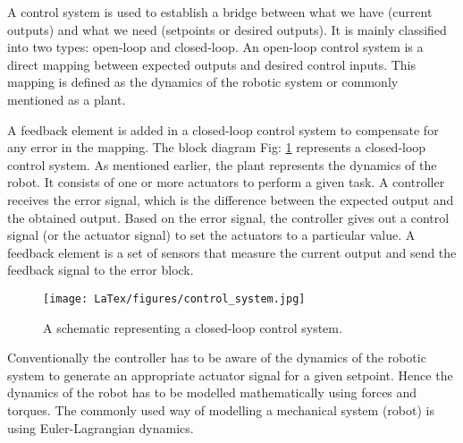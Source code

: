 
A control system is used to establish a bridge between what we have (current outputs) and what we need (setpoints or desired outputs). It is mainly classified into two types: open-loop and closed-loop. An open-loop control system is a direct mapping between expected outputs and desired control inputs. This mapping is defined as the dynamics of the robotic system or commonly mentioned as a plant.

A feedback element is added in a closed-loop control system to compensate for any error in the mapping. The block diagram Fig: \ref{fig:closed_loop} represents a closed-loop control system. As mentioned earlier, the plant represents the dynamics of the robot. It consists of one or more actuators to perform a given task. A controller receives the error signal, which is the difference between the expected output and the obtained output. Based on the error signal, the controller gives out a control signal (or the actuator signal) to set the actuators to a particular value. A feedback element is a set of sensors that measure the current output and send the feedback signal to the error block.


\begin{figure}
	\centering
	\texttt{[image: LaTex/figures/control\_system.jpg]}%
	\caption{{A schematic representing a closed-loop control system.}}\label{fig:closed_loop}
\end{figure}


Conventionally the controller has to be aware of the dynamics of the robotic system to generate an appropriate actuator signal for a given setpoint. Hence the dynamics of the robot has to be modelled mathematically using forces and torques. The commonly used way of modelling a mechanical system (robot) is using Euler-Lagrangian dynamics.